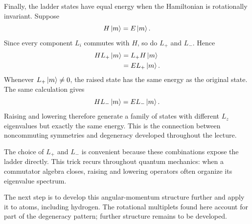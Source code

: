 Finally, the ladder states have equal energy when the Hamiltonian is rotationally invariant. Suppose
\begin{equation}
H\left\lvert m\right\rangle=E\left\lvert m\right\rangle.
\end{equation}
Since every component \(L_i\) commutes with \(H\), so do \(L_+\) and \(L_-\). Hence
\begin{align}
H L_+\left\lvert m\right\rangle
&=L_+H\left\lvert m\right\rangle\\
&=E L_+\left\lvert m\right\rangle.
\end{align}
Whenever \(L_+\left\lvert m\right\rangle\neq0\), the raised state has the same energy as the original state. The same calculation gives
\begin{equation}
H L_-\left\lvert m\right\rangle=E L_-\left\lvert m\right\rangle.
\end{equation}
Raising and lowering therefore generate a family of states with different \(L_z\) eigenvalues but exactly the same energy. This is the connection between noncommuting symmetries and degeneracy developed throughout the lecture.

\begin{classroomqa}
\end{classroomqa}

The choice of \(L_+\) and \(L_-\) is convenient because these combinations expose the ladder directly. This trick recurs throughout quantum mechanics: when a commutator algebra closes, raising and lowering operators often organize its eigenvalue spectrum.

\begin{classroomqa}
\end{classroomqa}

The next step is to develop this angular-momentum structure further and apply it to atoms, including hydrogen. The rotational multiplets found here account for part of the degeneracy pattern; further structure remains to be developed.
